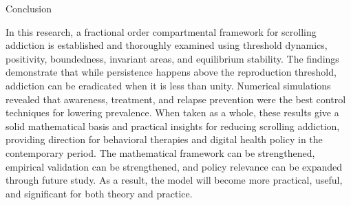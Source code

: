 \documentclass[10pt]{NSP1}
\begin{document}
Conclusion

In this research, a fractional order compartmental framework for scrolling addiction is established and thoroughly examined using threshold dynamics, positivity, boundedness, invariant areas, and equilibrium stability. The findings demonstrate that while persistence happens above the reproduction threshold, addiction can be eradicated when it is less than unity. Numerical simulations revealed that awareness, treatment, and relapse prevention were the best control techniques for lowering prevalence. When taken as a whole, these results give a solid mathematical basis and practical insights for reducing scrolling addiction, providing direction for behavioral therapies and digital health policy in the contemporary period. The mathematical framework can be strengthened, empirical validation can be strengthened, and policy relevance can be expanded through future study. As a result, the model will become more practical, useful, and significant for both theory and practice.
\end{document}
